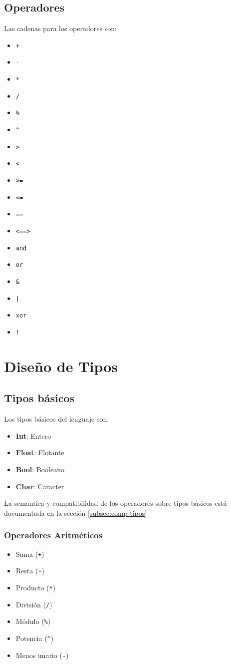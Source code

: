 \documentclass[12pt, spanish]{report}
\begin{document}
\section{Operadores}
\label{sec:agrup}
Las cadenas para los operadores son:
\begin{itemize}
\item \texttt{+}
\item \texttt{-}
\item \texttt{*}
\item \texttt{/}
\item \texttt{\%}
\item \texttt{\^}
\item \texttt{>}
\item \texttt{<}
\item \texttt{>=}
\item \texttt{<=}
\item \texttt{==}
\item \texttt{<==>}
\item \texttt{and}
\item \texttt{or}
\item \texttt{\&}
\item \texttt{|}
\item \texttt{xor}
\item \texttt{!}
\end{itemize}

\chapter{Dise\~no de Tipos}
\label{sec:tipos}

\section{Tipos b\'asicos}
\label{sec:tiposbasicos}

Los tipos b\'asicos del lenguaje son:

\begin{itemize}
\item \textbf{Int}: Entero
\item \textbf{Float}: Flotante
\item \textbf{Bool}: Booleano
\item \textbf{Char}: Caracter 
\end{itemize}
La semantica y compatibilidad de los operadores sobre 
tipos b\'asicos est\'a documentada en la secci\'on \ref{subsec:comp-tipos}

\subsection{Operadores Aritm\'eticos}
\begin{itemize}
\item Suma (\texttt{+})
\item Resta    (\texttt{-})
\item Producto (\texttt{*})
\item Divisi\'on  (\texttt{/})
\item M\'odulo (\texttt{\%})
\item Potencia (\texttt{\^})
\item Menos unario (\texttt{-})
\end{itemize}
\end{document}
